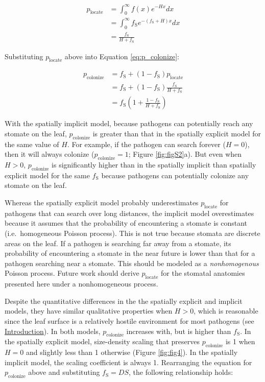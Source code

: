 \documentclass[utf8]{frontiersSCNS}
\newcommand{\fs}{$f_\text{S}$}
\begin{document}
\begin{align*}
  p_\text{locate} & = \int_0^\infty f(x) e^{-Hx} dx \\
                  & = \int_0^\infty f_\text{S} e^{-(f_\text{S} + H)x} dx \\
                  & = \frac{f_\text{S}}{H + f_\text{S}}
\end{align*}

Substituting \(p_\text{locate}\) above into Equation
\ref{eq:p_colonize}:

\begin{align*}
  p_\text{colonize} & = f_\text{S} + (1 - f_\text{S}) p_\text{locate} \\
                    & = f_\text{S} + (1 - f_\text{S}) \frac{f_\text{S}}{H + f_\text{S}} \\
                    & = f_\text{S} (1 + \frac{1 - f_\text{S}}{H + f_\text{S}})
\end{align*}

With the spatially implicit model, because pathogens can potentially
reach any stomate on the leaf, \(p_\text{colonize}\) is greater than
that in the spatially explicit model for the same value of \(H\). For
example, if the pathogen can search forever (\(H = 0\)), then it will
always colonize (\(p_\text{colonize} = 1\); Figure \ref{fig:figS2}a).
But even when \(H > 0\), \(p_\text{colonize}\) is significantly higher
than in the spatially implicit than spatially explicit model for the
same \fs{} because pathogens can potentially colonize any stomate on the
leaf.

Whereas the spatially explicit model probably underestimates
\(p_\text{locate}\) for pathogens that can search over long distances,
the implicit model overestimates because it assumes that the probability
of encountering a stomate is constant (i.e.~homogeneous Poisson
process). This is not true because stomata are discrete areas on the
leaf. If a pathogen is searching far away from a stomate, its
probability of encountering a stomate in the near future is lower than
that for a pathogen searching near a stomate. This should be modeled as
a \emph{nonhomogenous} Poisson process. Future work should derive
\(p_\text{locate}\) for the stomatal anatomies presented here under a
nonhomogeneous process.

Despite the quantitative differences in the the spatially explicit and
implicit models, they have similar qualitative properties when
\(H > 0\), which is reasonable since the leaf surface is a relatively
hostile environment for most pathogens (see
\protect\hyperlink{introduction}{Introduction}). In both models,
\(p_\text{colonize}\) increases with, but is higher than \fs. In the
spatially explicit model, size-density scaling that preserves
\(p_\text{colonize}\) is 1 when \(H = 0\) and slightly less than 1
otherwise (Figure \ref{fig:fig4}). In the spatially implicit model, the
scaling coefficient is always 1. Rearranging the equation for
\(p_\text{colonize}\) above and substituting \(f_\text{S} = DS\), the
following relationship holds:
\end{document}
